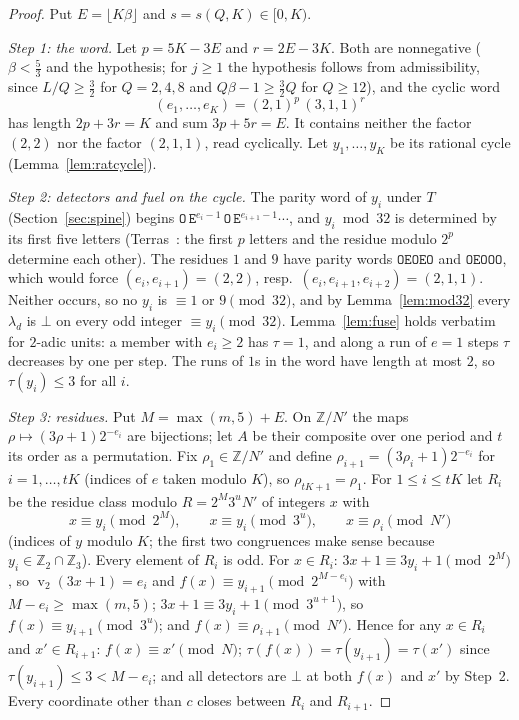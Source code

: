 \documentclass[11pt]{article}
\theoremstyle{definition}
\theoremstyle{remark}
\newcommand{\Z}{\mathbb{Z}}
\DeclareMathOperator{\vv}{v}
\begin{document}
\begin{proof}
Put $E=\lfloor K\beta\rfloor$ and $s=s(Q,K)\in[0,K)$.

\emph{Step 1: the word.} Let $p=5K-3E$ and $r=2E-3K$. Both are
nonnegative ($\beta<\tfrac53$ and the hypothesis; for $j\ge1$ the
hypothesis follows from admissibility, since $L/Q\ge\tfrac32$ for
$Q=2,4,8$ and $Q\beta-1\ge\tfrac32Q$ for $Q\ge12$), and the cyclic word
\[
(e_1,\dots,e_K)=(2,1)^{p}\,(3,1,1)^{r}
\]
has length $2p+3r=K$ and sum $3p+5r=E$. It contains neither the
factor $(2,2)$ nor the factor $(2,1,1)$, read cyclically. Let
$y_1,\dots,y_K$ be its rational cycle (Lemma~\ref{lem:ratcycle}).

\emph{Step 2: detectors and fuel on the cycle.} The parity word of
$y_i$ under $T$ (Section~\ref{sec:spine}) begins
$\mathtt O\,\mathtt E^{e_i-1}\,\mathtt O\,\mathtt E^{e_{i+1}-1}\cdots$,
and $y_i\bmod32$ is determined by its first five letters
(Terras~\cite{Terras1976}: the first $p$ letters and the residue modulo
$2^{p}$ determine each other). The residues $1$ and $9$ have parity
words $\mathtt{OEOEO}$ and $\mathtt{OEOOO}$, which would force
$(e_i,e_{i+1})=(2,2)$, resp.\ $(e_i,e_{i+1},e_{i+2})=(2,1,1)$. Neither
occurs, so no $y_i$ is $\equiv1$ or $9\pmod{32}$, and by
Lemma~\ref{lem:mod32} every $\lambda_d$ is $\bot$ on every odd integer
$\equiv y_i\pmod{32}$. Lemma~\ref{lem:fuse} holds verbatim for $2$-adic
units: a member with $e_i\ge2$ has $\tau=1$, and along a run of
$e=1$ steps $\tau$ decreases by one per step. The runs of $1$s in the
word have length at most $2$, so $\tau(y_i)\le3$ for all $i$.

\emph{Step 3: residues.} Put $M=\max(m,5)+E$. On $\Z/N'$ the maps
$\rho\mapsto(3\rho+1)2^{-e_i}$ are bijections; let $A$ be their
composite over one period and $t$ its order as a permutation. Fix
$\rho_1\in\Z/N'$ and define $\rho_{i+1}=(3\rho_i+1)2^{-e_i}$ for
$i=1,\dots,tK$ (indices of $e$ taken modulo $K$), so $\rho_{tK+1}=\rho_1$.
For $1\le i\le tK$ let $R_i$ be the residue class modulo
$R=2^{M}3^{u}N'$ of integers $x$ with
\[
x\equiv y_i\pmod{2^{M}},\qquad x\equiv y_i\pmod{3^{u}},\qquad
x\equiv\rho_i\pmod{N'}
\]
(indices of $y$ modulo $K$; the first two congruences make sense
because $y_i\in\Z_2\cap\Z_3$). Every element of $R_i$ is odd. For
$x\in R_i$: $3x+1\equiv3y_i+1\pmod{2^{M}}$, so $\vv_2(3x+1)=e_i$ and
$f(x)\equiv y_{i+1}\pmod{2^{M-e_i}}$ with $M-e_i\ge\max(m,5)$;
$3x+1\equiv3y_i+1\pmod{3^{u+1}}$, so $f(x)\equiv y_{i+1}\pmod{3^{u}}$;
and $f(x)\equiv\rho_{i+1}\pmod{N'}$. Hence for any $x\in R_i$ and
$x'\in R_{i+1}$: $f(x)\equiv x'\pmod N$; $\tau(f(x))=\tau(y_{i+1})=\tau(x')$
since $\tau(y_{i+1})\le3<M-e_i$; and all detectors are $\bot$ at both
$f(x)$ and $x'$ by Step~2. Every coordinate other than $c$ closes between
$R_i$ and $R_{i+1}$.


\end{proof}
\end{document}
